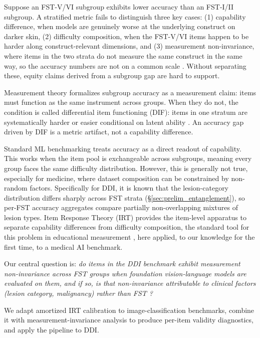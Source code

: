 \documentclass{article}
\begin{document}
Suppose an FST-V/VI subgroup exhibits lower accuracy than an FST-I/II subgroup. A stratified metric fails to distinguish three key cases: (1) capability difference, when models are genuinely worse at the underlying construct on darker skin, (2) difficulty composition, when the FST-V/VI items happen to be harder along construct-relevant dimensions, and (3) measurement non-invariance, where items in the two strata do not measure the same construct in the same way, so the accuracy numbers are not on a common scale \citep{borsboom2004concept}. Without separating these, equity claims derived from a subgroup gap are hard to support.

Measurement theory formalizes subgroup accuracy as a measurement claim: items must function as the same instrument across groups. When they do not, the condition is called differential item functioning (DIF): items in one stratum are systematically harder or easier conditional on latent ability \citep{holland1993differential}. An accuracy gap driven by DIF is a metric artifact, not a capability difference.

Standard ML benchmarking treats accuracy as a direct readout of capability. This works when the item pool is exchangeable across subgroups, meaning every group faces the same difficulty distribution. However, this is generally not true, especially for medicine, where dataset composition can be constrained by non-random factors. Specifically for DDI, it is known that the lesion-category distribution differs sharply across FST strata (\S\ref{sec:prelim_entanglement}), so per-FST accuracy aggregates compare partially non-overlapping mixtures of lesion types. Item Response Theory (IRT) provides the item-level apparatus to separate capability differences from difficulty composition, the standard tool for this problem in educational measurement \citep{millsap2011statistical}, here applied, to our knowledge for the first time, to a medical AI benchmark.

Our central question is: \textit{do items in the DDI benchmark \citep{daneshjou2022disparities} exhibit measurement non-invariance across FST groups when foundation vision-language models are evaluated on them, and if so, is that non-invariance attributable to clinical factors (lesion category, malignancy) rather than FST ?}

We adapt amortized IRT calibration \citep{truong2025reliableefficientamortizedmodelbased} to image-classification benchmarks, combine it with measurement-invariance analysis to produce per-item validity diagnostics, and apply the pipeline to DDI. 
\end{document}

